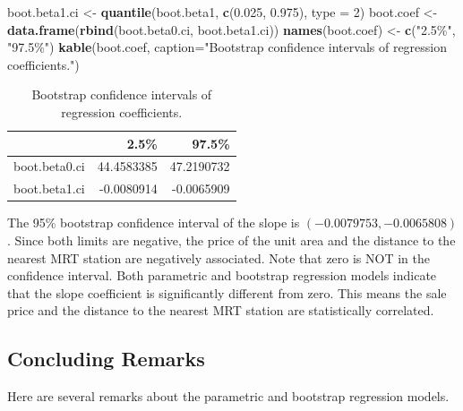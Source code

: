 \documentclass[
]{book}
\newenvironment{Shaded}{\begin{snugshade}}{\end{snugshade}}
\newcommand{\AttributeTok}[1]{\textcolor[rgb]{0.13,0.29,0.53}{#1}}
\newcommand{\DecValTok}[1]{\textcolor[rgb]{0.00,0.00,0.81}{#1}}
\newcommand{\FloatTok}[1]{\textcolor[rgb]{0.00,0.00,0.81}{#1}}
\newcommand{\FunctionTok}[1]{\textcolor[rgb]{0.13,0.29,0.53}{\textbf{#1}}}
\newcommand{\NormalTok}[1]{#1}
\newcommand{\OtherTok}[1]{\textcolor[rgb]{0.56,0.35,0.01}{#1}}
\newcommand{\StringTok}[1]{\textcolor[rgb]{0.31,0.60,0.02}{#1}}
\begin{document}
\begin{Shaded}
\begin{Highlighting}[]
\NormalTok{boot.beta1.ci }\OtherTok{\textless{}{-}} \FunctionTok{quantile}\NormalTok{(boot.beta1, }\FunctionTok{c}\NormalTok{(}\FloatTok{0.025}\NormalTok{, }\FloatTok{0.975}\NormalTok{), }\AttributeTok{type =} \DecValTok{2}\NormalTok{)}
\NormalTok{boot.coef }\OtherTok{\textless{}{-}} \FunctionTok{data.frame}\NormalTok{(}\FunctionTok{rbind}\NormalTok{(boot.beta0.ci, boot.beta1.ci)) }
\FunctionTok{names}\NormalTok{(boot.coef) }\OtherTok{\textless{}{-}} \FunctionTok{c}\NormalTok{(}\StringTok{"2.5\%"}\NormalTok{, }\StringTok{"97.5\%"}\NormalTok{)}
\FunctionTok{kable}\NormalTok{(boot.coef, }\AttributeTok{caption=}\StringTok{"Bootstrap confidence intervals of regression coefficients."}\NormalTok{)}
\end{Highlighting}
\end{Shaded}

\begin{table}

\caption{\label{tab:unnamed-chunk-72}Bootstrap confidence intervals of regression coefficients.}
\centering
\begin{tabular}[t]{l|r|r}
\hline
  & 2.5\% & 97.5\%\\
\hline
boot.beta0.ci & 44.4583385 & 47.2190732\\
\hline
boot.beta1.ci & -0.0080914 & -0.0065909\\
\hline
\end{tabular}
\end{table}

The 95\% bootstrap confidence interval of the slope is \((-0.0079753,-0.0065808)\). Since both limits are negative, the price of the unit area and the distance to the nearest MRT station are negatively associated. Note that zero is NOT in the confidence interval. Both parametric and bootstrap regression models indicate that the slope coefficient is significantly different from zero. This means the sale price and the distance to the nearest MRT station are statistically correlated.

\hypertarget{concluding-remarks}{%
\subsection{Concluding Remarks}\label{concluding-remarks}}

Here are several remarks about the parametric and bootstrap regression models.
\end{document}
